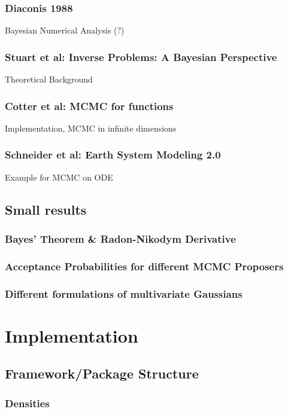 \documentclass[11pt]{article}
\begin{document}
\subsubsection{Diaconis 1988}
\label{sec:orgeb4af76}
Bayesian Numerical Analysis (?)
\subsubsection{Stuart et al: Inverse Problems: A Bayesian Perspective}
\label{sec:org4f69e19}
Theoretical Background
\subsubsection{Cotter et al: MCMC for functions}
\label{sec:orge58ad79}
Implementation, MCMC in infinite dimensions
\subsubsection{Schneider et al: Earth System Modeling 2.0}
\label{sec:orgda949c8}
Example for MCMC on ODE
\subsection{Small results}
\label{sec:org880b1b0}
\subsubsection{Bayes' Theorem \& Radon-Nikodym Derivative}
\label{sec:orga5d8e8b}
\subsubsection{Acceptance Probabilities for different MCMC Proposers}
\label{sec:orge6b77b3}
\subsubsection{Different formulations of multivariate Gaussians}
\label{sec:orgb3d2150}

\section{Implementation}
\label{sec:org40e421e}
\subsection{Framework/Package Structure}
\label{sec:orgf5bf7e8}
\subsubsection{Densities}
\label{sec:orgf091d03}
\end{document}
